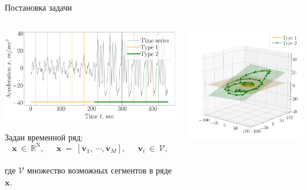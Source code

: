 \documentclass[10pt,pdf,hyperref={unicode}]{beamer}
\begin{document}
\begin{frame}[shrink=5]{Постановка задачи}

\begin{center}
	\begin{columns}
   		 \begin{column}{0.7\textwidth}
        			\includegraphics[width=1\textwidth]{results/example_slides}
			
			 Задан временной ряд: $$\textbf{x}~\in~\mathbb{R}^{\text{N}},~\quad~\textbf{x}~=~[\textbf{v}_1,~\cdots, \textbf{v}_M],~\quad~\textbf{v}_i~\in~\mathcal{V},$$\\ где $\mathcal{V}$ множество возможных сегментов в ряде $\textbf{x}$.
   		 \end{column}
   		 \begin{column}{0.55\textwidth}
        			\includegraphics[width=1\textwidth]{results/example_phase}
			

\end{column}
\end{columns}
\end{center}
\end{frame}
\end{document}

